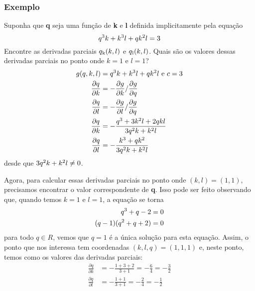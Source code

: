 \documentclass[a4paper]{article}
\begin{document}
\subsubsection*{Exemplo}
Suponha que \textbf{q} seja uma função de \textbf{k} e \textbf{l} definida implicitamente pela equação
\begin{equation}
    q\textsuperscript{3}k + k\textsuperscript{3}l + qk\textsuperscript{2}l= 3
\end{equation}
Encontre as derivadas parciais $q\textsubscript{k}(k,l)$ e $q\textsubscript{l}(k,l)$. Quais são os valores dessas derivadas parciais no ponto onde $k = 1$ e $l = 1$?
\begin{equation}
    \begin{split}
        g(q,k,l) & = q\textsuperscript{3}k + k\textsuperscript{3}l + qk\textsuperscript{2}l  \textrm{ e } c = 3\\
        \frac{\partial q}{\partial k} &= - \frac{\partial g}{\partial k}/\frac{\partial g}{\partial q} \\
        \frac{\partial q}{\partial l} &= - \frac{\partial g}{\partial l}/\frac{\partial g}{\partial q} \\
        \frac{\partial q}{\partial k} &= - \frac{q\textsuperscript{3} + 3k\textsuperscript{2}l + 2qkl}{3q\textsuperscript{2}k + k\textsuperscript{2}l}\\
        \frac{\partial q}{\partial l} &= - \frac{k\textsuperscript{3} + qk\textsuperscript{2}}{3q\textsuperscript{2}k + k\textsuperscript{2}l}\\
    \end{split}
\end{equation}
desde que $3q\textsuperscript{2}k + k\textsuperscript{2}l \neq 0$.
\par Agora, para calcular essas derivadas parciais no ponto onde $(k,l) = (1,1)$, precisamos encontrar o valor correspondente de \textbf{q}. Isso pode ser feito observando que, quando temos $k = 1$ e $l = 1$, a equação se torna
\begin{equation}
    \begin{split}
        q\textsuperscript{3} + q - 2 &= 0\\
        (q - 1)(q\textsuperscript{2} + q + 2) &= 0
    \end{split}
\end{equation}
para todo $q \in R$, vemos que $q = 1$ é a única solução para esta equação. Assim, o ponto que nos interessa tem coordenadas $(k,l,q) = (1,1,1)$ e, neste ponto, temos como os valores das derivadas parciais:
\begin{equation}
    \begin{split}
        \frac{\partial q}{\partial k} &= - \frac{1 + 3 + 2}{3 + 1} = - \frac{6}{4} = - \frac{3}{2} \\
        \frac{\partial q}{\partial l} &= - \frac{1 + 1}{3 + 1} = - \frac{2}{4} = - \frac{1}{2}
    \end{split}
\end{equation}
\end{document}

